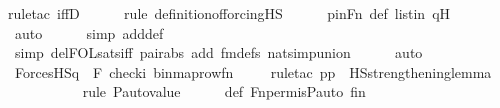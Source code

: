\begin{isabellebody}
{\isacharparenleft}{\kern0pt}rule{\isacharunderscore}{\kern0pt}tac\ iffD{}{\isacharparenright}{\kern0pt}\isanewline
\ \ \ \ \ \isamarkupfalse%
{\isacharparenleft}{\kern0pt}rule\ definition{\isacharunderscore}{\kern0pt}of{\isacharunderscore}{\kern0pt}forcing{\isacharunderscore}{\kern0pt}HS{\isacharparenright}{\kern0pt}\isanewline
\ \ \ \ \isamarkupfalse%
\ pinFn\ {\isasymphi}{\isacharunderscore}{\kern0pt}def\ listin{\isacharprime}{\kern0pt}{\isacharprime}{\kern0pt}\ qH\isanewline
\ \ \ \ \ \ \ \ \isamarkupfalse%
\ auto{\isacharbrackleft}{\kern0pt}{}{\isacharbrackright}{\kern0pt}\isanewline
\ \ \ \ \ \isamarkupfalse%
{\isacharparenleft}{\kern0pt}simp\ add{\isacharcolon}{\kern0pt}{\isasymphi}{\isacharunderscore}{\kern0pt}def{\isacharparenright}{\kern0pt}\isanewline
\ \ \ \ \ \isamarkupfalse%
\ {\isacharparenleft}{\kern0pt}simp\ del{\isacharcolon}{\kern0pt}FOL{\isacharunderscore}{\kern0pt}sats{\isacharunderscore}{\kern0pt}iff\ pair{\isacharunderscore}{\kern0pt}abs\ add{\isacharcolon}{\kern0pt}\ fm{\isacharunderscore}{\kern0pt}defs\ nat{\isacharunderscore}{\kern0pt}simp{\isacharunderscore}{\kern0pt}union{\isacharparenright}{\kern0pt}\isanewline
\ \ \ \ \isamarkupfalse%
\ auto\isanewline
\isanewline
\ \ \isamarkupfalse%
\ {\isachardoublequoteopen}ForcesHS{\isacharparenleft}{\kern0pt}q{\isacharcomma}{\kern0pt}\ {\isasymphi}{\isacharcomma}{\kern0pt}\ {\isacharbrackleft}{\kern0pt}F{\isacharprime}{\kern0pt}{\isacharcomma}{\kern0pt}\ check{\isacharparenleft}{\kern0pt}i{\isacharparenright}{\kern0pt}{\isacharcomma}{\kern0pt}\ binmap{\isacharunderscore}{\kern0pt}row{\isacharprime}{\kern0pt}{\isacharparenleft}{\kern0pt}f{\isacharbackquote}{\kern0pt}n{\isacharparenright}{\kern0pt}{\isacharbrackright}{\kern0pt}{\isacharparenright}{\kern0pt}{\isachardoublequoteclose}\isanewline
\ \ \ \ \isamarkupfalse%
{\isacharparenleft}{\kern0pt}rule{\isacharunderscore}{\kern0pt}tac\ p{\isacharequal}{\kern0pt}{\isachardoublequoteopen}{\isasympi}{\isacharbackquote}{\kern0pt}p{\isachardoublequoteclose}\ \ HS{\isacharunderscore}{\kern0pt}strengthening{\isacharunderscore}{\kern0pt}lemma{\isacharparenright}{\kern0pt}\isanewline
\ \ \ \ \ \ \ \ \ \ \isamarkupfalse%
{\isacharparenleft}{\kern0pt}rule\ P{\isacharunderscore}{\kern0pt}auto{\isacharunderscore}{\kern0pt}value{\isacharparenright}{\kern0pt}\isanewline
\ \ \ \ \isamarkupfalse%
\ {\isasympi}{\isacharunderscore}{\kern0pt}def\ Fn{\isacharunderscore}{\kern0pt}perm{\isacharprime}{\kern0pt}{\isacharunderscore}{\kern0pt}is{\isacharunderscore}{\kern0pt}P{\isacharunderscore}{\kern0pt}auto\ fin\ \isanewline

\end{isabellebody}
